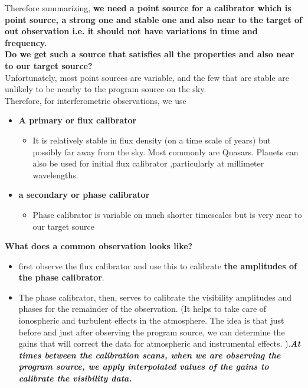 \documentclass[10pt]{report}
\newcommand{\tbf}[1]{\textbf{#1}}
\newcommand{\tit}[1]{\textit{#1}}
\begin{document}
Therefore summarizing, \tbf{we need a point source for a calibrator which is point source, a strong one and  stable one and also near to the target of out observation i.e. it should not have variations in time and frequency.}\\

\tbf{Do we get such a source that satisfies all the properties and also near to our target source?}\\
 Unfortunately, most point sources are variable, and the few that are stable are unlikely to be nearby to the program source on the sky.  \\
 Therefore, for interferometric observations, we use
\begin{itemize}
\item \tbf{A primary or flux calibrator}
\begin{itemize}
\item It is relatively stable in flux density (on a time scale of years) but possibly far away from the sky. Most commonly are Quasars. Planets can also be used for initial flux calibrator ,particularly at millimeter wavelengths.
\end{itemize}
\item \tbf{a secondary or phase calibrator}
\begin{itemize}
\item Phase calibrator is variable on much shorter timescales but is very near to our target source
\end{itemize}
\end{itemize}

\tbf{What does a common observation looks like?}\\
 \begin{itemize}
\item first observe the flux calibrator and use this to calibrate \tbf{the amplitudes of the phase calibrator}. 
\item The phase calibrator, then, serves to calibrate the visibility amplitudes and phases for the remainder of the observation. (It helps to take care of ionospheric and turbulent effects in the atmosphere.  The idea is that just before and just after observing the program source, we can determine the gains that will correct the data for atmospheric and instrumental effects. ).\tbf{\tit{At times between the calibration scans, when we are observing the program source, we apply interpolated values of the gains to calibrate the visibility data. }}
\end{itemize}
\end{document}

